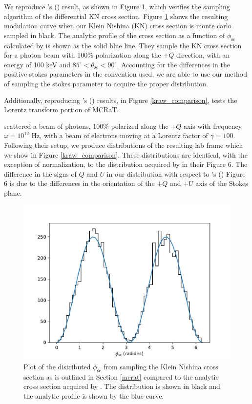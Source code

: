 \documentclass[12pt,a4paper]{article}
\begin{document}
{We reproduce \citeauthor{depaola2003new}'s  (\citeyear{depaola2003new}) result, as shown in Figure \ref{depaola_comparison},  which verifies the sampling algorithm of the differential KN cross section. Figure  \ref{depaola_comparison} shows the resulting modulation curve when our Klein Nishina (KN) cross section is monte carlo sampled in black. The analytic profile of the cross section as a function of $\phi_\mathrm{sc}$ calculated by \cite{depaola2003new} is shown as the solid blue line. They sample the KN cross section for a photon beam with 100\% polarization along the $+Q$ direction, with an energy of 100 keV and $85^\circ<\theta_\mathrm{sc}<90^\circ$. Accounting for the differences in the positive stokes parameters in the convention used, we are able to use our method of sampling the stokes parameter to acquire the proper distribution.


Additionally, reproducing \citeauthor{krawczynski2011polarization}'s  (\citeyear{krawczynski2011polarization}) results, in Figure \ref{kraw_comparison}, tests the Lorentz transform portion of MCRaT.} \cite{krawczynski2011polarization} scattered a beam of photons, 100\% polarized along the $+Q$ axis with frequency $\omega=10^{12}$ Hz, with a beam of electrons moving at a Lorentz factor of $\gamma=100$. Following their setup, we produce distributions of the resulting lab frame which we show in Figure \ref{kraw_comparison}. These distributions are identical, with the exception of normalization, to the distribution acquired by \cite{krawczynski2011polarization} in their Figure 6. The difference in the signs of $Q$ and $U$ in our distribution with respect to \citeauthor{krawczynski2011polarization}'s (\citeyear{krawczynski2011polarization}) Figure 6 is due to the differences in the orientation of the $+Q$ and $+U$ axis of the Stokes plane.

\begin{figure}[h!]
 \centering
 \includegraphics[]{phi_sampling_depaola}
 \caption{Plot of the distributed $\phi_\mathrm{sc}$ from sampling the Klein Nishina cross section as is outlined in Section \ref{mcrat} compared to the analytic cross section acquired by \cite{depaola2003new}. The distribution is shown in black and the analytic profile is shown by the blue curve.}
 \label{depaola_comparison}
 \end{figure}
\end{document}
